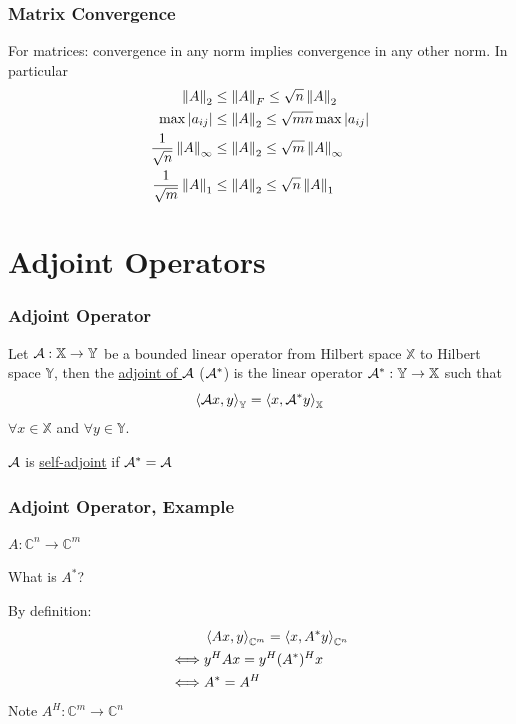 \documentclass{beamer}
\begin{document}
\begin{frame}\frametitle{Matrix Convergence}
	For matrices: convergence in any norm implies convergence in any other norm.  In particular
	\begin{align*}
		\left\|A \right\|_2 &\leq \left\|A \right\|_F \leq \sqrt{n}\left\|A \right\|_2\\
		\max|a_{ij}| &\leq \left\|A \right\|_2 \leq \sqrt{mn}\max|a_{ij}|\\
		\frac{1}{\sqrt{n}}\left\|A \right\|_{\infty} &\leq \left\|A \right\|_2 \leq \sqrt{m}\left\|A\right\|_{\infty}\\
		\frac{1}{\sqrt{m}}\left\|A \right\|_1 &\leq \left\|A \right\|_2 \leq \sqrt{n}\left\|A \right\|_1
	\end{align*}	
\end{frame}


\section{Adjoint Operators}
\frame{\sectionpage}

\begin{frame}\frametitle{Adjoint Operator}
	\begin{definition}
		Let $\mathcal{A}: \mathbb{X} \to \mathbb{Y}$ be a bounded linear operator from Hilbert space $\mathbb{X}$ to Hilbert space $\mathbb{Y}$, then the \underline{adjoint of $\mathcal{A}$} ($\mathcal{A}^\ast$) is the linear operator $\mathcal{A}^\ast:\mathbb{Y}\to\mathbb{X}$ such that
			\[ 
			\left<\mathcal{A} x,y \right>_{\mathbb{Y}} = \left<x,\mathcal{A}^\ast y \right>_{\mathbb{X}} 
			\]
			$\forall x\in\mathbb{X}$ and $\forall y \in \mathbb{Y}$.  
			
			\vspace{1cm}
			
			$\mathcal{A}$ is \underline{self-adjoint} if $\mathcal{A}^\ast=\mathcal{A}$
	\end{definition}
\end{frame}

\begin{frame}\frametitle{Adjoint Operator, Example}
	\begin{example}
		$A:\mathbb{C}^n \to \mathbb{C}^m$	
			
		\vspace{0.5cm}
		What is $A^\ast$?
		\vspace{0.5cm}
		
		By definition:
		\begin{align*}
			& 	\left<Ax,y \right>_{\mathbb{C}^m} = \left<x,A^\ast y \right>_{\mathbb{C}^n} \\
			\iff & y^HAx = y^H (A^\ast)^H x \\
			\iff & A^\ast = A^H
		\end{align*}
		\vspace{0.5cm}
		Note $A^H : \mathbb{C}^m \to \mathbb{C}^n$
	\end{example}
\end{frame}
\end{document}

